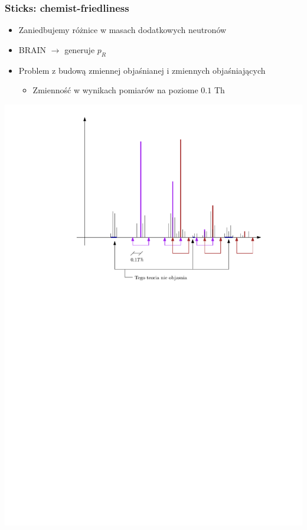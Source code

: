 \documentclass[xetex]{beamer}
\begin{document}

	\begin{frame}\frametitle{Sticks: chemist-friedliness}
		\begin{itemize}
			\item 	Zaniedbujemy różnice w masach dodatkowych neutronów
			\item 	BRAIN $\rightarrow$ generuje $p_R$
			\item 	Problem z budową zmiennej objaśnianej i zmiennych objaśniających
			\begin{itemize}
				\item 	Zmienność w wynikach pomiarów na poziome $0.1$ Th  	
			\end{itemize}
		\end{itemize}
	\end{frame}

	\begin{frame}[plain]
	    \begin{center}
	        \includegraphics[height=.9\textheight,keepaspectratio]{./picts/sticks}
	    \end{center}
	\end{frame}
\end{document}
